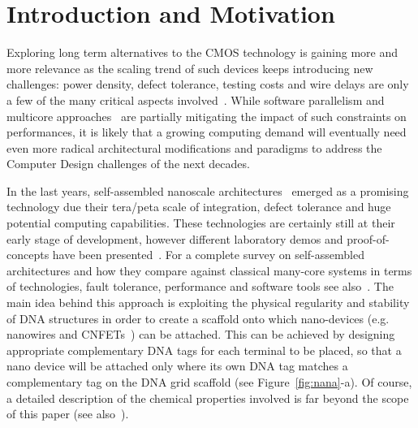 
\section{Introduction and Motivation}
\label{sec:introduction}

Exploring long term alternatives to the CMOS technology is gaining
more and more relevance as the scaling trend of such devices keeps
introducing new challenges: power density, defect tolerance, testing
costs and wire delays are only a few of the many critical aspects
involved~\cite{itrs13}. 
While software parallelism and multicore
approaches~\cite{Kavi2012243,Sibai2011958} are partially mitigating the impact of such
constraints on performances, it is likely that a growing computing demand will
eventually need even more radical architectural modifications and 
paradigms to address the Computer Design challenges of the next
decades.

In the last years, self-assembled nanoscale
architectures~\cite{yan2003} emerged as a promising technology due
their tera/peta scale of integration, defect tolerance and huge
potential computing capabilities. These technologies are certainly
still at their early stage of development, however different
laboratory demos and proof-of-concepts have been
presented~\cite{patwardhan2006_1, pistol2009}. For a complete survey on self-assembled architectures and
how they compare against classical many-core systems in terms of
 technologies, fault tolerance, performance and software tools see
 also~\cite{Future}.
The main idea behind this approach is exploiting the physical
regularity and stability of DNA structures in order to create a
scaffold onto which nano-devices (e.g. nanowires and
CNFETs~\cite{bachtold2001, cui2001}) can be attached. This
can be achieved by designing appropriate complementary DNA tags for
each terminal to be placed, so that a nano device will be attached
only where its own DNA tag matches a complementary tag on the DNA grid
scaffold (see Figure~\ref{fig:nana}-a).  Of course, a detailed
description of the chemical properties involved is far beyond the
scope of this paper (see also~\cite{seeman1999}). 

